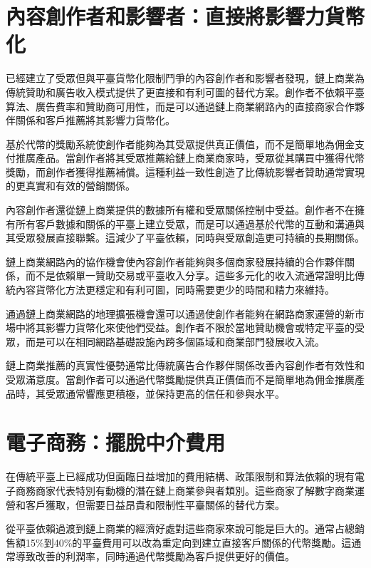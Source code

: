 \documentclass[
  Letterpaper,
]{scrbook}
\begin{document}
\section{內容創作者和影響者：直接將影響力貨幣化}\label{ux5167ux5bb9ux5275ux4f5cux8005ux548cux5f71ux97ffux8005ux76f4ux63a5ux5c07ux5f71ux97ffux529bux8ca8ux5e63ux5316}

已經建立了受眾但與平臺貨幣化限制鬥爭的內容創作者和影響者發現，鏈上商業為傳統贊助和廣告收入模式提供了更直接和有利可圖的替代方案。創作者不依賴平臺算法、廣告費率和贊助商可用性，而是可以通過鏈上商業網路內的直接商家合作夥伴關係和客戶推薦將其影響力貨幣化。

基於代幣的獎勵系統使創作者能夠為其受眾提供真正價值，而不是簡單地為佣金支付推廣產品。當創作者將其受眾推薦給鏈上商業商家時，受眾從其購買中獲得代幣獎勵，而創作者獲得推薦補償。這種利益一致性創造了比傳統影響者贊助通常實現的更真實和有效的營銷關係。

內容創作者還從鏈上商業提供的數據所有權和受眾關係控制中受益。創作者不在擁有所有客戶數據和關係的平臺上建立受眾，而是可以通過基於代幣的互動和溝通與其受眾發展直接聯繫。這減少了平臺依賴，同時與受眾創造更可持續的長期關係。

鏈上商業網路內的協作機會使內容創作者能夠與多個商家發展持續的合作夥伴關係，而不是依賴單一贊助交易或平臺收入分享。這些多元化的收入流通常證明比傳統內容貨幣化方法更穩定和有利可圖，同時需要更少的時間和精力來維持。

通過鏈上商業網路的地理擴張機會還可以通過使創作者能夠在網路商家運營的新市場中將其影響力貨幣化來使他們受益。創作者不限於當地贊助機會或特定平臺的受眾，而是可以在相同網路基礎設施內跨多個區域和商業部門發展收入流。

鏈上商業推薦的真實性優勢通常比傳統廣告合作夥伴關係改善內容創作者有效性和受眾滿意度。當創作者可以通過代幣獎勵提供真正價值而不是簡單地為佣金推廣產品時，其受眾通常響應更積極，並保持更高的信任和參與水平。

\section{電子商務：擺脫中介費用}\label{ux96fbux5b50ux5546ux52d9ux64faux812bux4e2dux4ecbux8cbbux7528}

在傳統平臺上已經成功但面臨日益增加的費用結構、政策限制和算法依賴的現有電子商務商家代表特別有動機的潛在鏈上商業參與者類別。這些商家了解數字商業運營和客戶獲取，但需要日益昂貴和限制性平臺關係的替代方案。

從平臺依賴過渡到鏈上商業的經濟好處對這些商家來說可能是巨大的。通常占總銷售額15\%到40\%的平臺費用可以改為重定向到建立直接客戶關係的代幣獎勵。這通常導致改善的利潤率，同時通過代幣獎勵為客戶提供更好的價值。
\end{document}
